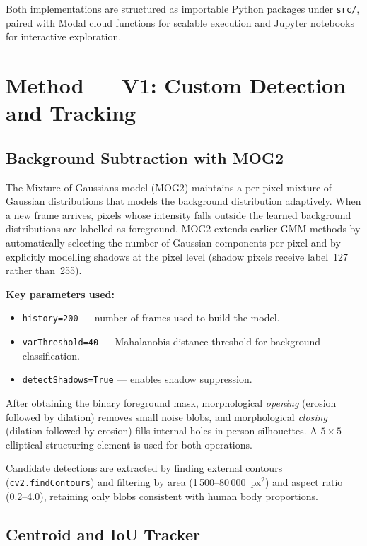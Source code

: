 \documentclass[12pt,a4paper]{article}
\begin{document}
Both implementations are structured as importable Python packages under
\texttt{src/}, paired with Modal cloud functions for scalable execution and
Jupyter notebooks for interactive exploration.

\section{Method --- V1: Custom Detection and Tracking}

\subsection{Background Subtraction with MOG2}

The Mixture of Gaussians model (MOG2) \cite{mog2zivkovic} maintains a
per-pixel mixture of Gaussian distributions that models the background
distribution adaptively. When a new frame arrives, pixels whose intensity
falls outside the learned background distributions are labelled as foreground.
MOG2 extends earlier GMM methods by automatically selecting the number of
Gaussian components per pixel and by explicitly modelling shadows at the pixel
level (shadow pixels receive label~127 rather than~255).

\textbf{Key parameters used:}
\begin{itemize}
    \item \texttt{history=200} --- number of frames used to build the model.
    \item \texttt{varThreshold=40} --- Mahalanobis distance threshold for
          background classification.
    \item \texttt{detectShadows=True} --- enables shadow suppression.
\end{itemize}

After obtaining the binary foreground mask, morphological \emph{opening}
(erosion followed by dilation) removes small noise blobs, and morphological
\emph{closing} (dilation followed by erosion) fills internal holes in person
silhouettes. A $5\times5$ elliptical structuring element is used for both
operations.

Candidate detections are extracted by finding external contours
(\texttt{cv2.findContours}) and filtering by area (1\,500--80\,000~px$^2$) and
aspect ratio (0.2--4.0), retaining only blobs consistent with human body
proportions.

\subsection{Centroid and IoU Tracker}
\end{document}
